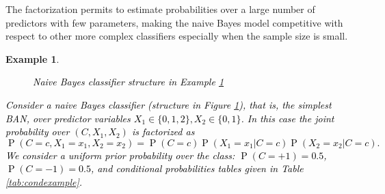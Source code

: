 \documentclass[11pt,a4paper, twoside]{book}
\newtheorem{example}{Example}[chapter]
\newcommand{\Pp}{\operatorname{P}}
\begin{document}
The factorization permits to estimate probabilities over a large number of predictors with few parameters, making the naive Bayes model competitive with respect to other more complex classifiers especially when the sample size is small.



\begin{example}
\label{exp:naivebayes}
\textcolor{black}{\begin{figure}[h!]
\centering
{}  
\caption{\textcolor{black}{Naive Bayes classifier structure in Example \ref{exp:naivebayes}}}
\label{fig:naivebayes}
\end{figure}}
\textcolor{black}{Consider a naive Bayes classifier (structure in Figure \ref{fig:naivebayes}), that is, the simplest BAN, over predictor variables $X_1 \in \{0,1,2\},X_2 \in \{0,1\}$.
In this case the joint probability over $(C,X_1,X_2)$ is factorized as
$$ \Pp(C=c,X_1=x_1,X_2=x_2)=\Pp(C=c)\Pp(X_1=x_1|C=c)\Pp(X_2=x_2|C=c). $$
We consider a uniform prior probability over the class: $\Pp(C=+1)=0.5$, $\Pp(C=-1)=0.5$, and conditional probabilities tables given in Table \ref{tab:condexample}.}


\end{example}
\end{document}
